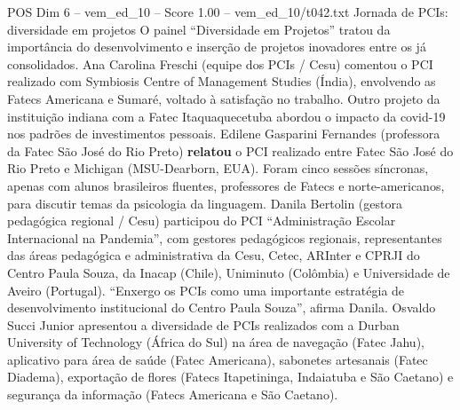 \begin{textsample}{POS Dim 6 – vem\_ed\_10 – Score 1.00 – vem\_ed\_10/t042.txt}  \label{ex:f6_pos_037}
Jornada de PCIs: diversidade em projetos O painel “Diversidade em Projetos” tratou da importância do desenvolvimento e inserção de projetos inovadores entre os já consolidados.
Ana Carolina Freschi (equipe dos PCIs / Cesu) comentou o PCI realizado com Symbiosis Centre of Management Studies (Índia), envolvendo as Fatecs Americana e Sumaré, voltado à satisfação no trabalho.
Outro projeto da instituição indiana com a Fatec Itaquaquecetuba abordou o impacto da covid-19 nos padrões de investimentos pessoais.
Edilene Gasparini Fernandes (professora da Fatec São José do Rio Preto) \textbf{relatou} o PCI realizado entre Fatec São José do Rio Preto e Michigan (MSU-Dearborn, EUA).
Foram cinco sessões síncronas, apenas com alunos brasileiros fluentes, professores de Fatecs e norte-americanos, para discutir temas da psicologia da linguagem.
Danila Bertolin (gestora pedagógica regional / Cesu) participou do PCI “Administração Escolar Internacional na Pandemia”, com gestores pedagógicos regionais, representantes das áreas pedagógica e administrativa da Cesu, Cetec, ARInter e CPRJI do Centro Paula Souza, da Inacap (Chile), Uniminuto (Colômbia) e Universidade de Aveiro (Portugal). “Enxergo os PCIs como uma importante estratégia de desenvolvimento institucional do Centro Paula Souza”, afirma Danila.
Osvaldo Succi Junior apresentou a diversidade de PCIs realizados com a Durban University of Technology (África do Sul) na área de navegação (Fatec Jahu), aplicativo para área de saúde (Fatec Americana), sabonetes artesanais (Fatec Diadema), exportação de flores (Fatecs Itapetininga, Indaiatuba e São Caetano) e segurança da informação (Fatecs Americana e São Caetano).

\end{textsample}
